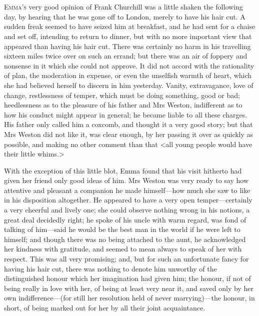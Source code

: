 \chapter[Chapter \thechapter]{}
\lettrine[lraise=0.3]{E}{mma's} very good opinion of Frank Churchill was a little shaken the following day, by hearing that he was gone off to London, merely to have his hair cut. A sudden freak seemed to have seized him at breakfast, and he had sent for a chaise and set off, intending to return to dinner, but with no more important view that appeared than having his hair cut. There was certainly no harm in his travelling sixteen miles twice over on such an errand; but there was an air of foppery and nonsense in it which she could not approve. It did not accord with the rationality of plan, the moderation in expense, or even the unselfish warmth of heart, which she had believed herself to discern in him yesterday. Vanity, extravagance, love of change, restlessness of temper, which must be doing something, good or bad; heedlessness as to the pleasure of his father and Mrs Weston, indifferent as to how his conduct might appear in general; he became liable to all these charges. His father only called him a coxcomb, and thought it a very good story; but that Mrs Weston did not like it, was clear enough, by her passing it over as quickly as possible, and making no other comment than that <all young people would have their little whims.>

With the exception of this little blot, Emma found that his visit hitherto had given her friend only good ideas of him. Mrs Weston was very ready to say how attentive and pleasant a companion he made himself—how much she saw to like in his disposition altogether. He appeared to have a very open temper—certainly a very cheerful and lively one; she could observe nothing wrong in his notions, a great deal decidedly right; he spoke of his uncle with warm regard, was fond of talking of him—said he would be the best man in the world if he were left to himself; and though there was no being attached to the aunt, he acknowledged her kindness with gratitude, and seemed to mean always to speak of her with respect. This was all very promising; and, but for such an unfortunate fancy for having his hair cut, there was nothing to denote him unworthy of the distinguished honour which her imagination had given him; the honour, if not of being really in love with her, of being at least very near it, and saved only by her own indifference—(for still her resolution held of never marrying)—the honour, in short, of being marked out for her by all their joint acquaintance.

